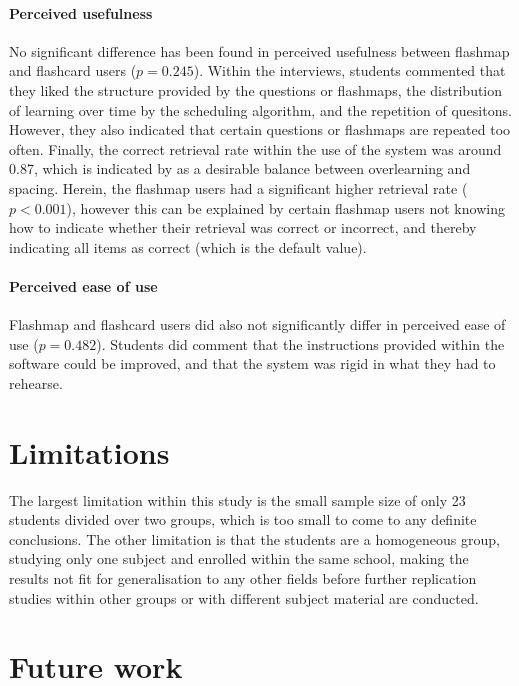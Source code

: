 \paragraph{Perceived usefulness} No significant difference has been found in perceived usefulness between flashmap and flashcard users ($p=0.245$). Within the interviews, students commented that they liked the structure provided by the questions or flashmaps, the distribution of learning over time by the scheduling algorithm, and the repetition of quesitons. However, they also indicated that certain questions or flashmaps are repeated too often. Finally, the correct retrieval rate within the use of the system was around 0.87, which is indicated by  as a desirable balance between overlearning and spacing. Herein, the flashmap users had a significant higher retrieval rate ($p<0.001$), however this can be explained by certain flashmap users not knowing how to indicate whether their retrieval was correct or incorrect, and thereby indicating all items as correct (which is the default value).

\paragraph{Perceived ease of use} Flashmap and flashcard users did also not significantly differ in perceived ease of use ($p=0.482$). Students did comment that the instructions provided within the software could be improved, and that the system was rigid in what they had to rehearse. 

\section{Limitations}

The largest limitation within this study is the small sample size of only 23 students divided over two groups, which is too small to come to any definite conclusions. The other limitation is that the students are a homogeneous group, studying only one subject and enrolled within the same school, making the results not fit for generalisation to any other fields before further replication studies within other groups or with different subject material are conducted.

\section{Future work}


